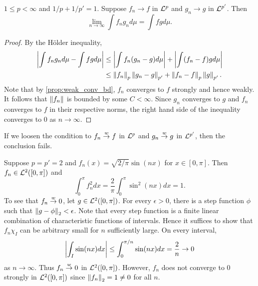 \begin{proposition}
    $1\leq p<\infty$ and $1/p+1/p'=1$. Suppose $f_n\to f$ in $\mathcal{L}^p$ 
    and $g_n\to g$ in $\mathcal{L}^{p'}$. Then 
    \begin{equation*}
        \lim_{n\to\infty}\int f_ng_nd\mu = \int fg d\mu.
    \end{equation*}
\end{proposition}
\begin{proof}
    By the H\"older inequality, 
    \begin{equation*}
        \begin{split}
            \left\lvert {\int f_ng_nd\mu - \int fgd\mu} \right\rvert 
            &\leq \left\lvert {\int f_n(g_n-g)d\mu} \right\rvert + \left\lvert {\int (f_n-f)gd\mu} \right\rvert \\
            &\leq \left\lVert {f_n} \right\rVert_p\left\lVert {g_n-g} \right\rVert_{p'} + \left\lVert {f_n-f} \right\rVert_p\left\lVert {g} \right\rVert_{p'}.
        \end{split}
    \end{equation*}
    Note that by \cref{prop:weak_conv_bd}, $f_n$ converges 
    to $f$ strongly and hence weakly. It follows that $\left\lVert {f_n} \right\rVert$ 
    is bounded by some $C<\infty$. Since $g_n$ converges to $g$ 
    and $f_n$ converges to $f$ in their respective norms, the 
    right hand side of the inequality converges to $0$ as $n\to\infty$.
\end{proof}
\begin{remark}
    If we loosen the condition to $f_n\overset{w}{\to} f$ in $\mathcal{L}^p$ 
    and $g_n\overset{w}{\to} g$ in $\mathcal{L}^{p'}$, then the conclusion 
    fails.
\end{remark}
\begin{example}
    Suppose $p=p'=2$ and $f_n(x) = \sqrt{2/\pi}\sin(nx)$ for 
    $x\in[0,\pi]$. Then $f_n\in\mathcal{L}^2([0,\pi])$ and 
    \begin{equation*}
        \int_0^\pi f_n^2dx = \frac{2}{\pi}\int_0^\pi \sin^2(nx)dx = 1.
    \end{equation*}
    To see that $f_n \overset{w}{\to} 0$, let $g\in\mathcal{L}^2([0,\pi])$. 
    For every $\epsilon>0$, there is a step function $\phi$ such 
    that $\left\lVert {g-\phi} \right\rVert_2<\epsilon$. Note that every step function 
    is a finite linear combination of characteristic functions of 
    intervals. Hence it suffices to show that $f_n\chi_I$ can be 
    arbitrary small for $n$ sufficiently large. On every interval, 
    \begin{equation*}
        \left\lvert {\int_I \sin(nx)dx} \right\rvert \leq \int_{0}^{\pi/n}\sin(nx)dx 
        = \frac{2}{n}\to 0
    \end{equation*}
    as $n\to\infty$. Thus $f_n\overset{w}{\to} 0$ in $\mathcal{L}^2([0,\pi])$. 
    However, $f_n$ does not converge to $0$ strongly in $\mathcal{L}^2([0,\pi])$ 
    since $\left\lVert {f_n} \right\rVert_2 = 1\neq 0$ for all $n$.
\end{example}

